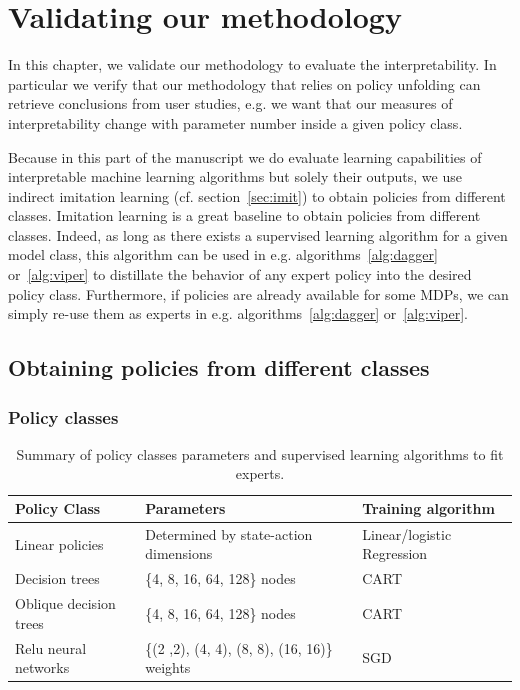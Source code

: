 \chapter{Validating our methodology}\label{sec:exps1}

In this chapter, we validate our methodology to evaluate the interpretability.
In particular we verify that our methodology that relies on policy unfolding can retrieve conclusions from user studies, e.g. we want that our measures of interpretability change with parameter number inside a given policy class.

Because in this part of the manuscript we do evaluate learning capabilities of interpretable machine learning algorithms but solely their outputs, we use indirect imitation learning (cf. section~\ref{sec:imit}) to obtain policies from different classes.
Imitation learning is a great baseline to obtain policies from different classes.
Indeed, as long as there exists a supervised learning algorithm for a given model class, this algorithm can be used in e.g. algorithms~\ref{alg:dagger} or~\ref{alg:viper} to distillate the behavior of any expert policy into the desired policy class. 
Furthermore, if policies are already available for some MDPs, we can simply re-use them as experts in e.g. algorithms~\ref{alg:dagger} or~\ref{alg:viper}.

\section{Obtaining policies from different classes}

\subsection{Policy classes}
\begin{table}[ht]
\centering
\small
\begin{tabular}{lll}
\hline
\textbf{Policy Class} & \textbf{Parameters} & \textbf{Training algorithm} \\
\hline
Linear policies & Determined by state-action dimensions & Linear/logistic Regression \\
Decision trees & \{4, 8, 16, 64, 128\} nodes & CART \\
Oblique decision trees & \{4, 8, 16, 64, 128\} nodes & CART \\
Relu neural networks & \{(2 ,2), (4, 4), (8, 8), (16, 16)\} weights & SGD \\
\hline
\end{tabular}
\caption{Summary of policy classes parameters and supervised learning algorithms to fit experts.}
\label{tab:policy-classes}
\end{table}

